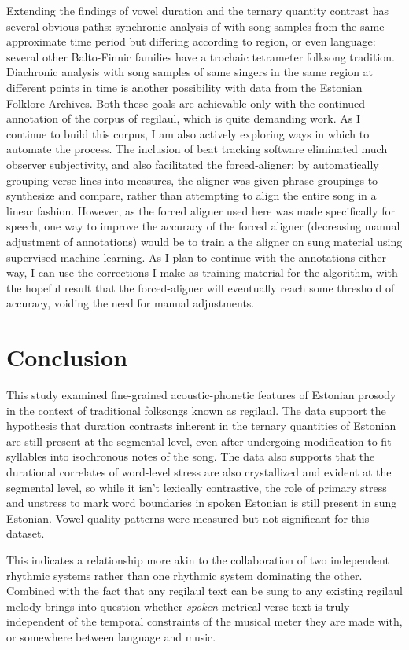 Extending the findings of vowel duration and the ternary quantity contrast has several obvious paths: synchronic analysis of with song samples from the same approximate time period but differing according to region, or even language: several other Balto-Finnic families have a trochaic tetrameter folksong tradition. Diachronic analysis with song samples of same singers in the same region at different points in time is another possibility with data from the Estonian Folklore Archives. Both these goals are achievable only with the continued annotation of the corpus of regilaul, which is quite demanding work. As I continue to build this corpus, I am also actively exploring ways in which to automate the process. The inclusion of beat tracking software eliminated much observer subjectivity, and also facilitated the forced-aligner: by automatically grouping verse lines into measures, the aligner was given phrase groupings to synthesize and compare, rather than attempting to align the entire song in a linear fashion. However, as the forced aligner used here was made specifically for speech, one way to improve the accuracy of the forced aligner (decreasing manual adjustment of annotations) would be to train a the aligner on sung material using supervised machine learning. As I plan to continue with the annotations either way, I can use the corrections I make as training material for the algorithm, with the hopeful result that the forced-aligner will eventually reach some threshold of accuracy, voiding the need for manual adjustments. 


\section{Conclusion}

This study examined fine-grained acoustic-phonetic features of Estonian prosody in the context of traditional folksongs known as regilaul. The data support the hypothesis that duration contrasts inherent in the ternary quantities of Estonian are still present at the segmental level, even after undergoing modification to fit syllables into isochronous notes of the song. The data also supports that the durational correlates of word-level stress are also crystallized and evident at the segmental level, so while it isn't lexically contrastive, the role of primary stress and unstress to mark word boundaries in spoken Estonian is still present in sung Estonian. Vowel quality patterns were measured but not significant for this dataset. 

This indicates a relationship more akin to the collaboration of two independent rhythmic systems rather than one rhythmic system dominating the other. Combined with the fact that any regilaul text can be sung to any existing regilaul melody brings into question whether {\it spoken} metrical verse text is truly independent of the temporal constraints of the musical meter they are made with, or somewhere between language and music. 

